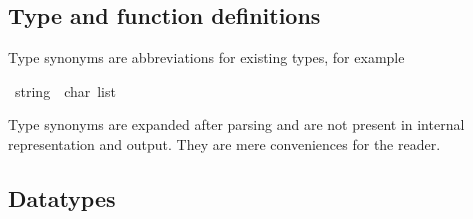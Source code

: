 %
\begin{isabellebody}%
\def\isabellecontext{Types{\isaliteral{5F}{\isacharunderscore}}and{\isaliteral{5F}{\isacharunderscore}}funs}%
%
\isadelimtheory
%
\endisadelimtheory
%
\isatagtheory
%
\endisatagtheory
{\isafoldtheory}%
%
\isadelimtheory
%
\endisadelimtheory
%
\begin{isamarkuptext}%
\vspace{-5ex}
\section{Type and function definitions}

Type synonyms are abbreviations for existing types, for example%
\end{isamarkuptext}%
\isamarkuptrue%
\isamarkupfalse%
\ string\ {}\ {}char\ list{}%
\begin{isamarkuptext}%
Type synonyms are expanded after parsing and are not present in internal representation and output. They are mere conveniences for the reader.

\subsection{Datatypes}


\end{isamarkuptext}
\end{isabellebody}
